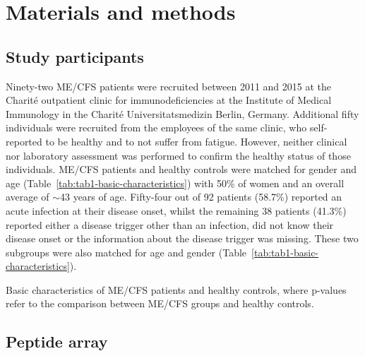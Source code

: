\section{Materials and methods}

\subsection{Study participants}

Ninety-two ME/CFS patients were recruited between 2011 and 2015 at the Charité outpatient clinic for immunodeficiencies at the Institute of Medical Immunology in the Charité Universitatsmedizin Berlin, Germany. Additional fifty individuals were recruited from the employees of the same clinic, who self-reported to be healthy and to not suffer from fatigue. However, neither clinical nor laboratory assessment was performed to confirm the healthy status of those individuals. ME/CFS patients and healthy controls were matched for gender and age (Table~\ref{tab:tab1-basic-characteristics}) with 50\% of women and an overall average of ${\sim}$43 years of age. Fifty-four out of 92 patients (58.7\%) reported an acute infection at their disease onset, whilst the remaining 38 patients (41.3\%) reported either a disease trigger other than an infection, did not know their disease onset or the information about the disease trigger was missing. These two subgroups were also matched for age and gender (Table~\ref{tab:tab1-basic-characteristics}).

\begin{table}[h]
    \centering
    \caption[Basic characteristics of ME/CFS patients and healthy controls]{Basic characteristics of ME/CFS patients and healthy controls, where p-values refer to the comparison between ME/CFS groups and healthy controls.}
    
    \label{tab:tab1-basic-characteristics}
\end{table}

\subsection{Peptide array}

